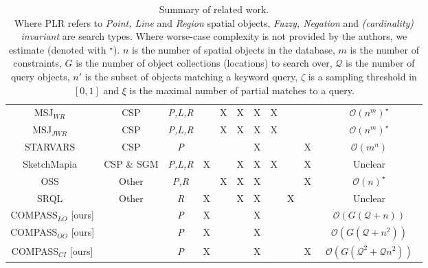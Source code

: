 {\begin{table*}[t]
\begin{center}
\begin{tabular}{|c|cc|cccc|ccc|c|}
            MSJ$_{WR}$~\cite{Papadias1998}              & CSP         & \textit{P,L,R} &   & X & X & X & X &   &   & $\mathcal{O}(n^m)^{\star}$ \\ %
            MSJ$_{JWR}$~\cite{Papadias1998}             & CSP         & \textit{P,L,R} &   & X & X & X & X &   &   & $\mathcal{O}(n^m)^{\star}$ \\ %
            STARVARS~\cite{Lee2013}                     & CSP         & \textit{P}     &   &   &   & X &   &   & X & $\mathcal{O}(m^n)$ \\
            SketchMapia~\cite{Schwering2014,Jan2015}    & CSP \& SGM  & \textit{P,L,R} & X &   & X & X & X &   & X & Unclear \\         %
            OSS~\cite{Liu2003}                          & Other       & \textit{P,R}   &   & X & X & X &   &   & X & $\mathcal{O}(n)^{\star}$ \\ %
            SRQL~\cite{Dellapenna2012,Dellapenna2017}   & Other       & \textit{R}     & X &   & X & X &   & X &   & Unclear \\
            COMPASS$_{LO}$ [ours]                       &             & \textit{P}     & X &   &   & X &   &   &   & $\mathcal{O}(G(\mathcal{Q} + n))$ \\    
            COMPASS$_{OO}$ [ours]                       &             & \textit{P}     & X &   &   & X &   &   &   & $\mathcal{O}(G(\mathcal{Q} + n^2))$ \\  
            COMPASS$_{CI}$ [ours]                       &             & \textit{P}     & X &   &   & X &   &   & X & ~$\mathcal{O}(G(\mathcal{Q}^2 + \mathcal{Q} n^2))$~ \\
            
            
            
            \hline     
        \end{tabular}
        \caption{Summary of related work. \\ \textnormal{Where PLR refers to \textit{Point, Line} and \textit{Region} spatial objects, \textit{Fuzzy, Negation} and \textit{(cardinality) invariant} are search types. Where worse-case complexity is not provided by the authors, we estimate (denoted with $^{\star}$). $n$ is the number of spatial objects in the database, $m$ is the number of constraints, $G$ is the number of object collections (locations) to search over, $\mathcal{Q}$ is the number of query objects, $n'$ is the subset of objects matching a keyword  query, $\zeta$ is a sampling threshold in $[0,1]$ and $\xi$ is the maximal number of partial matches to a query.}} 
        \label{Table:related_work}
    \end{center}
\end{table*}
}



